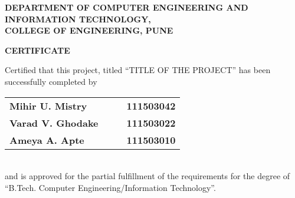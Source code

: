 %
\thispagestyle{empty}
\linespread{2}
\begin{center}			%
	\Large{\bf{DEPARTMENT OF COMPUTER ENGINEERING AND\\  INFORMATION TECHNOLOGY,\\
	       COLLEGE OF ENGINEERING, PUNE\\}}
\end{center}

\vspace{20pt}			%

\begin{center}
	\Large{\bf{CERTIFICATE\\}}
\end{center}

\vspace{20pt}

\linespread{1.5}			%
\selectfont
\large{
Certified that this project, titled ``TITLE OF THE PROJECT''
has been successfully completed by \\
\begin{table}[htbp]
	\begin{center}
	\begin{tabular}{ l c c l }
	\Large\bf{Mihir U. Mistry} & & & \Large\bf{111503042} \\ [0.3cm]
	\Large\bf{Varad V. Ghodake} & & & \Large\bf{111503022} \\ [0.3cm]
	\Large\bf{Ameya A. Apte} & & & \Large\bf{111503010} \\
	\end{tabular}
	\end{center}
	\end{table} \\
and is approved for the partial fulfillment of the requirements for the degree of
``B.Tech. Computer Engineering/Information Technology''.
}

\vspace{60pt}

